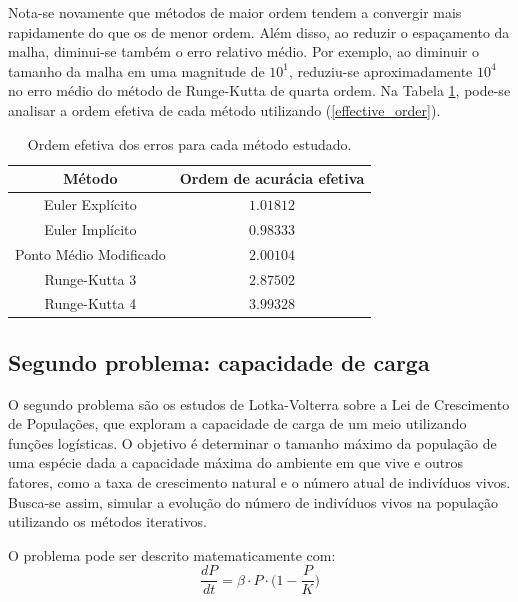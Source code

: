 Nota-se novamente que métodos de maior ordem tendem a convergir mais rapidamente do que os de menor ordem. Além disso, ao reduzir o espaçamento da malha, diminui-se também o erro relativo médio. Por exemplo, ao diminuir o tamanho da malha em uma magnitude de $10^1$, reduziu-se aproximadamente $10^4$ no erro médio do método de Runge-Kutta de quarta ordem. Na Tabela \ref{tab:ex1_effective_order}, pode-se analisar a ordem efetiva de cada método utilizando (\ref{effective_order}).

\begin{table}[H]
    \centering
    \begin{tabular}{|c|c|}
        \hline
        Método & Ordem de acurácia efetiva\\
        \hline \rule{0pt}{2.5ex} 
         Euler Explícito & $1.01812$\\\rule{0pt}{2.5ex} 
         Euler Implícito & $0.98333$\\\rule{0pt}{2.5ex} 
         Ponto Médio Modificado & $2.00104$\\\rule{0pt}{2.5ex} 
         Runge-Kutta 3 & $2.87502$\\\rule{0pt}{2.5ex} 
         Runge-Kutta 4 & $3.99328$\\
         \hline
    \end{tabular}
    \caption{Ordem efetiva dos erros para cada método estudado.}
    \label{tab:ex1_effective_order}
\end{table}



\subsection{Segundo problema: capacidade de carga}\label{problem-2} \quad
O segundo problema são os estudos de Lotka-Volterra sobre a Lei de Crescimento de Populações, que exploram a capacidade de carga de um meio utilizando funções logísticas. O objetivo é determinar o tamanho máximo da população de uma espécie dada a capacidade máxima do ambiente em que vive e outros fatores, como a taxa de crescimento natural e o número atual de indivíduos vivos. Busca-se assim, simular a evolução do número de indivíduos vivos na população utilizando os métodos iterativos.


O problema pode ser descrito matematicamente com:
\begin{equation}\label{carry_equation_to_be_solved}
	\frac{dP}{dt} = \beta \cdot P \cdot \bigg(1 - \frac{P}{K}\bigg)
\end{equation}

